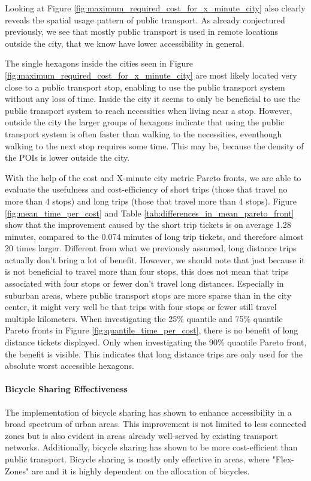 Looking at Figure \ref{fig:maximum_required_cost_for_x_minute_city} also clearly reveals the spatial usage pattern of public transport.
As already conjectured previously, we see that mostly public transport is used in remote locations outside the city, that we know have lower accessibility in general.

The single hexagons inside the cities seen in Figure \ref{fig:maximum_required_cost_for_x_minute_city} are most likely located very close to a public transport stop, enabling to use the public transport system without any loss of time.
Inside the city it seems to only be beneficial to use the public transport system to reach necessities when living near a stop.
However, outside the city the larger groups of hexagons indicate that using the public transport system is often faster than walking to the necessities, eventhough walking to the next stop requires some time.
This may be, because the density of the POIs is lower outside the city.

With the help of the cost and X-minute city metric Pareto fronts, we are able to evaluate the usefulness and cost-efficiency of short trips (those that travel no more than 4 stops) and long trips (those that travel more than 4 stops).
Figure \ref{fig:mean_time_per_cost} and Table \ref{tab:differences_in_mean_pareto_front} show that the improvement caused by the short trip tickets is on average 1.28 minutes, compared to the 0.074 minutes of long trip tickets, and therefore almost 20 times larger.
Different from what we previously assumed, long distance trips actually don't bring a lot of benefit.
However, we should note that just because it is not beneficial to travel more than four stops, this does not mean that trips associated with four stops or fewer don't travel long distances.
Especially in suburban areas, where public transport stops are more sparse than in the city center, it might very well be that trips with four stops or fewer still travel multiple kilometers.
When investigating the 25\% quantile and 75\% quantile Pareto fronts in Figure \ref{fig:quantile_time_per_cost}, there is no benefit of long distance tickets displayed.
Only when investigating the 90\% quantile Pareto front, the benefit is visible.
This indicates that long distance trips are only used for the absolute worst accessible hexagons.

\paragraph{Bicycle Sharing Effectiveness}
The implementation of bicycle sharing has shown to enhance accessibility in a broad spectrum of urban areas. 
This improvement is not limited to less connected zones but is also evident in areas already well-served by existing transport networks.
Additionally, bicycle sharing has shown to be more cost-efficient than public transport.
Bicycle sharing is mostly only effective in areas, where "Flex-Zones" are and it is highly dependent on the allocation of bicycles.

